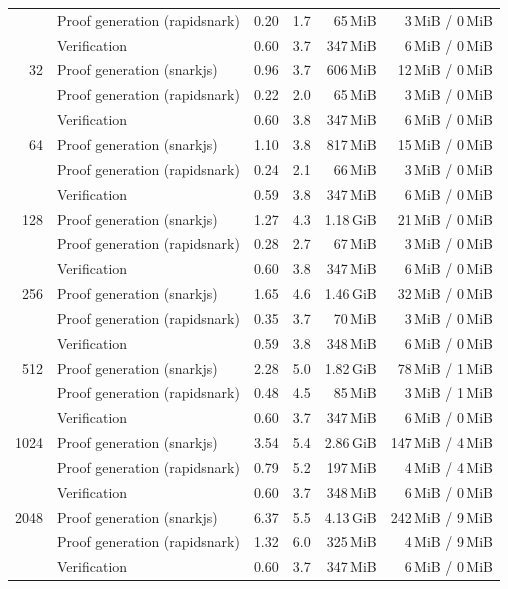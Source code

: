 \begin{table}[t]
{\begin{tabular}{|r|l|r|r|r|r|}
 & Proof generation (rapidsnark) & 0.20 & 1.7 & 65\,MiB & 3\,MiB / 0\,MiB \\
 & Verification & 0.60 & 3.7 & 347\,MiB & 6\,MiB / 0\,MiB \\
\hline
32 & Proof generation (snarkjs) & 0.96 & 3.7 & 606\,MiB & 12\,MiB / 0\,MiB \\
 & Proof generation (rapidsnark) & 0.22 & 2.0 & 65\,MiB & 3\,MiB / 0\,MiB \\
 & Verification & 0.60 & 3.8 & 347\,MiB & 6\,MiB / 0\,MiB \\
\hline
64 & Proof generation (snarkjs) & 1.10 & 3.8 & 817\,MiB & 15\,MiB / 0\,MiB \\
 & Proof generation (rapidsnark) & 0.24 & 2.1 & 66\,MiB & 3\,MiB / 0\,MiB \\
 & Verification & 0.59 & 3.8 & 347\,MiB & 6\,MiB / 0\,MiB \\
\hline
128 & Proof generation (snarkjs) & 1.27 & 4.3 & 1.18\,GiB & 21\,MiB / 0\,MiB \\
 & Proof generation (rapidsnark) & 0.28 & 2.7 & 67\,MiB & 3\,MiB / 0\,MiB \\
 & Verification & 0.60 & 3.8 & 347\,MiB & 6\,MiB / 0\,MiB \\
\hline
256 & Proof generation (snarkjs) & 1.65 & 4.6 & 1.46\,GiB & 32\,MiB / 0\,MiB \\
 & Proof generation (rapidsnark) & 0.35 & 3.7 & 70\,MiB & 3\,MiB / 0\,MiB \\
 & Verification & 0.59 & 3.8 & 348\,MiB & 6\,MiB / 0\,MiB \\
\hline
512 & Proof generation (snarkjs) & 2.28 & 5.0 & 1.82\,GiB & 78\,MiB / 1\,MiB \\
 & Proof generation (rapidsnark) & 0.48 & 4.5 & 85\,MiB & 3\,MiB / 1\,MiB \\
 & Verification & 0.60 & 3.7 & 347\,MiB & 6\,MiB / 0\,MiB \\
\hline
1024 & Proof generation (snarkjs) & 3.54 & 5.4 & 2.86\,GiB & 147\,MiB / 4\,MiB \\
 & Proof generation (rapidsnark) & 0.79 & 5.2 & 197\,MiB & 4\,MiB / 4\,MiB \\
 & Verification & 0.60 & 3.7 & 348\,MiB & 6\,MiB / 0\,MiB \\
\hline
2048 & Proof generation (snarkjs) & 6.37 & 5.5 & 4.13\,GiB & 242\,MiB / 9\,MiB \\
 & Proof generation (rapidsnark) & 1.32 & 6.0 & 325\,MiB & 4\,MiB / 9\,MiB \\
 & Verification & 0.60 & 3.7 & 347\,MiB & 6\,MiB / 0\,MiB \\

\end{tabular}}
\end{table}
